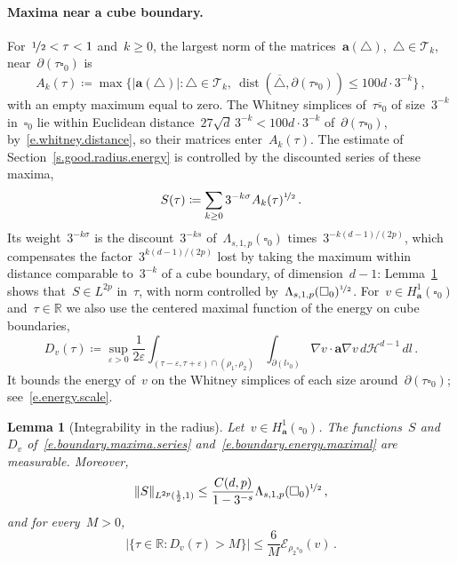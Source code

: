 \documentclass[11pt,letterpaper]{article}
\numberwithin{equation}{section}
\newtheorem{lemma}[theorem]{Lemma}
\theoremstyle{definition}
\newcommand{\R}{\mathbb{R}}
\renewcommand{\a}{\mathbf{a}}
\newcommand{\nf}{\nicefrac}
\newcommand{\cu}{\square}
\DeclareMathOperator{\dist}{dist}
\DeclarePairedDelimiter{\norm}{\lVert}{\rVert}
\newcommand{\Ener}{\mathcal E}
\begin{document}
\paragraph{Maxima near a cube boundary.} For~$\nf12<\tau<1$ and~$k\geq0$, the largest norm of the matrices~$\a(\triangle)$,~$\triangle\in\mathscr T_k$, near~$\partial(\tau\cu_0)$ is
\begin{equation}
	A_k(\tau)\coloneqq\max\bigl\{|\a(\triangle)|:\triangle\in\mathscr T_k,\ \dist(\overline \triangle,\partial(\tau\cu_0))\leq100d\cdot3^{-k}\bigr\}\,,
	\label{e.boundary.maxima}
\end{equation}
with an empty maximum equal to zero. The Whitney simplices of~$\tau\overline{\cu}_0$ of size~$3^{-k}$ in~$\cu_0$ lie within Euclidean distance~$27\sqrt d\,3^{-k}<100d\cdot3^{-k}$ of~$\partial(\tau\cu_0)$, by~\eqref{e.whitney.distance}, so their matrices enter~$A_k(\tau)$. The estimate of Section~\ref{s.good.radius.energy} is controlled by the discounted series of these maxima,
\begin{equation}
	S(\tau)\coloneqq\sum_{k\geq0}3^{-k\sigma}A_k(\tau)^{\nf12}\,.
	\label{e.boundary.maxima.series}
\end{equation}
Its weight~$3^{-k\sigma}$ is the discount~$3^{-ks}$ of~$\Lambda_{s,1,p}(\cu_0)$ times~$3^{-k(d-1)/(2p)}$, which compensates the factor~$3^{k(d-1)/(2p)}$ lost by taking the maximum within distance comparable to~$3^{-k}$ of a cube boundary, of dimension~$d-1$: Lemma~\ref{l.radius.averages} shows that~$S\in L^{2p}$ in~$\tau$, with norm controlled by~$\Lambda_{s,1,p}(\cu_0)^{\nf12}$. For~$v\in H^1_\a(\cu_0)$ and~$\tau\in\R$ we also use the centered maximal function of the energy on cube boundaries,
\begin{equation}
	D_v(\tau)\coloneqq\sup_{\varepsilon>0}\frac1{2\varepsilon}\int_{(\tau-\varepsilon,\tau+\varepsilon)\cap(\rho_1,\rho_2)}\int_{\partial(l\cu_0)}\nabla v\cdot\a\nabla v\,d\mathcal H^{d-1}\,dl\,.
	\label{e.boundary.energy.maximal}
\end{equation}
It bounds the energy of~$v$ on the Whitney simplices of each size around~$\partial(\tau\cu_0)$; see~\eqref{e.energy.scale}.

\begin{lemma}[Integrability in the radius]
\label{l.radius.averages}
Let~$v\in H^1_\a(\cu_0)$. The functions~$S$ and~$D_v$ of~\eqref{e.boundary.maxima.series} and~\eqref{e.boundary.energy.maximal} are measurable. Moreover,
\begin{equation}
	\norm{S}_{L^{2p}(\frac12,1)}\leq\frac{C(d,p)}{1-3^{-s}}\Lambda_{s,1,p}(\cu_0)^{\nf12}\,,
	\label{e.boundary.maxima.bound}
\end{equation}
and for every~$M>0$,
\begin{equation}
	\bigl|\{\tau\in\R:D_v(\tau)>M\}\bigr|\leq\frac{6}{M}\Ener_{\rho_2\cu_0}(v)\,.
	\label{e.energy.weak.bound}
\end{equation}
\end{lemma}
\end{document}
